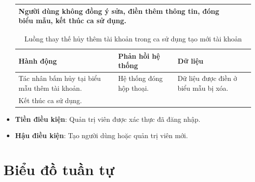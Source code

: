 \documentclass[./../main.tex]{subfiles}
\begin{document}
\begin{itemize}
\begin{table}[H]
\begin{tabularx}{\textwidth}{| X | X | X |}
            Người dùng không đồng ý sửa, điền thêm thông tin, đóng biểu mẫu, kết thúc ca sử dụng. & & 
            \\ \hline
        \end{tabularx}
        \end{table}
        \begin{table}[H]
        \caption{\label{uc-55}Luồng thay thế hủy thêm tài khoản trong ca sử dụng tạo mới tài khoản}
        \begin{tabularx}{\textwidth}{| X | X | X |}
            \hline
            \textbf{Hành động} & \textbf{Phản hồi hệ thống} & \textbf{Dữ liệu} \\ \hline
            Tác nhân bấm hủy tại biểu mẫu thêm tài khoản. & Hệ thống đóng hộp thoại. & Dữ liệu được điền ở biểu mẫu bị xóa.
            \\ \hline
            Kết thúc ca sử dụng. & &
            \\ \hline
        \end{tabularx}
        \end{table}
    \item \textbf{Tiền điều kiện}: Quản trị viên được xác thực đã đăng nhập.
    \item \textbf{Hậu điều kiện}: Tạo người dùng hoặc quản trị viên mới.
\end{itemize}

\section{Biểu đồ tuần tự}
\end{document}
